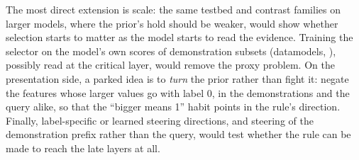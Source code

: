 The most direct extension is scale: the same testbed and contrast families on larger models, where the prior's hold should be weaker, would show whether selection starts to matter as the model starts to read the evidence.
Training the selector on the model's own scores of demonstration subsets (datamodels, \citealp{ilyas2022datamodels,chang2023data}), possibly read at the critical layer, would remove the proxy problem.
On the presentation side, a parked idea is to \emph{turn} the prior rather than fight it: negate the features whose larger values go with label 0, in the demonstrations and the query alike, so that the ``bigger means 1'' habit points in the rule's direction.
Finally, label-specific or learned steering directions, and steering of the demonstration prefix rather than the query, would test whether the rule can be made to reach the late layers at all.
